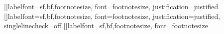 \RequirePackage{fmtcount}
\RequirePackage{ragged2e} %
\newcommand{\marginparstyle}{\footnotesize} %
\long\def\@ympar#1{%
  \@savemarbox\@marbox{\marginparstyle#1}%
  \global\setbox\@currbox\copy\@marbox %
  \@xympar}
\renewcommand*{\marginfont}{\marginparstyle}

\newcommand\newthought[1]{%
   \addvspace{1.0\baselineskip plus 0.5ex minus 0.2ex}%
   \noindent\textsc{#1}%
}%
\ExplSyntaxOn
\NewDocumentCommand {}
{ 
  {
    {
    }
    {
    }
  }
  {
    {
    }
    {
    }
  }
}
\ExplSyntaxOff

\usepackage{caption}
[]{labelfont={sf,bf,footnotesize}, font=footnotesize, justification=justified}
[]{labelfont={sf,bf,footnotesize}, font=footnotesize, justification=justified, singlelinecheck=off}
[]{labelfont={sf,bf,footnotesize}, font=footnotesize}

%

\flushbottom

